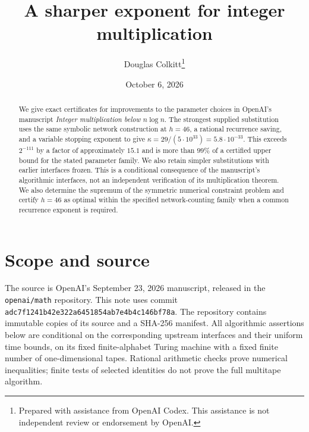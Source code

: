 \documentclass[11pt]{article}
\title{A sharper exponent for integer multiplication}
\author{Douglas Colkitt\thanks{Prepared with assistance from OpenAI Codex. This assistance is not independent review or endorsement by OpenAI.}}
\date{October 6, 2026}
\begin{document}
\maketitle
\begin{abstract}
We give exact certificates for improvements to the parameter choices in
OpenAI's manuscript \emph{Integer multiplication below $n\log n$}.
The strongest supplied substitution uses the same symbolic network construction
at $h=46$, a rational recurrence saving, and a variable stopping exponent to give
$\kappa=29/(5\cdot10^{33})=5.8\cdot10^{-33}$.
This exceeds $2^{-111}$ by a factor of approximately $15.1$ and is more
than $99\%$ of a certified upper bound for the stated parameter family.
We also retain simpler substitutions with earlier interfaces frozen.
This is a conditional consequence of the manuscript's algorithmic
interfaces, not an independent verification of its multiplication theorem.
We also determine the supremum of the symmetric numerical constraint
problem and certify $h=46$ as optimal within the specified network-counting
family when a common recurrence exponent is required.
\end{abstract}

\section{Scope and source}
The source is OpenAI's September 23, 2026 manuscript, released in the
\texttt{openai/math} repository. This note uses commit
\texttt{adc7f1241b42e322a6451854ab7e4b4c146bf78a}.
The repository contains immutable copies of its source and a SHA-256 manifest.
All algorithmic assertions below are conditional on the corresponding
upstream interfaces and their uniform time bounds, on its fixed finite-alphabet
Turing machine with a fixed finite number of one-dimensional tapes. Rational arithmetic
checks prove numerical inequalities; finite tests of selected identities
do not prove the full multitape algorithm.
\end{document}
